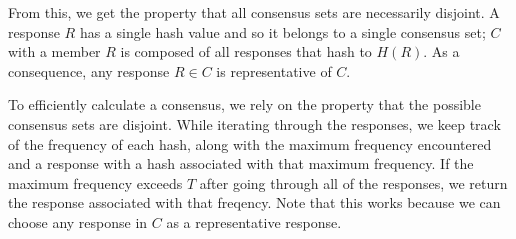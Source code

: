 From this, we get the property that all consensus sets are necessarily
disjoint. A response $R$ has a single hash value and so it belongs to a single
consensus set; $C$ with a member $R$ is composed of all responses that hash to
$H(R)$. As a consequence, any response $R \in C$ is representative of $C$.

To efficiently calculate a consensus, we rely on the property that the possible
consensus sets are disjoint. While iterating through the responses, we
keep track of the frequency of each hash, along with the maximum frequency
encountered and a response with a hash associated with that maximum frequency.
If the maximum frequency exceeds $T$ after going through all of the responses,
we return the response associated with that freqency. Note that this works
because we can choose any response in $C$ as a representative response.

